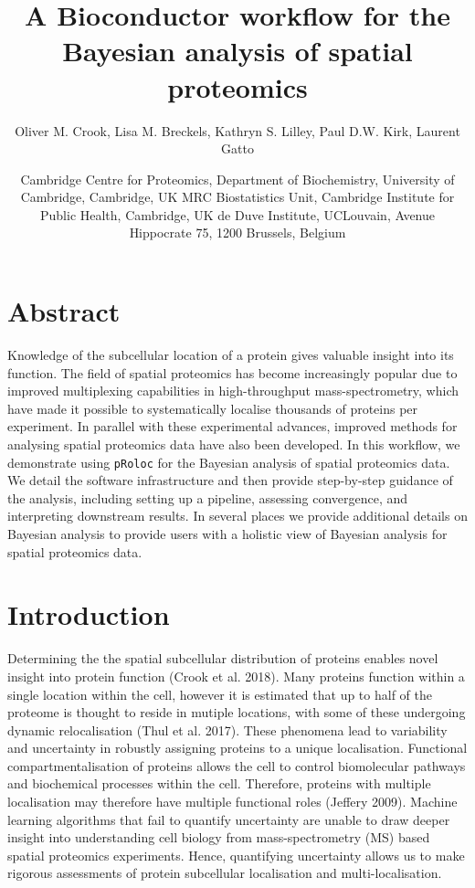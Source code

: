 \documentclass[]{article}
\title{A Bioconductor workflow for the Bayesian analysis of spatial proteomics}
\author{Oliver M. Crook, Lisa M. Breckels, Kathryn S. Lilley, Paul D.W. Kirk,
Laurent Gatto}
\date{Cambridge Centre for Proteomics, Department of Biochemistry, University
of Cambridge, Cambridge, UK \nsplit MRC Biostatistics Unit, Cambridge
Institute for Public Health, Cambridge, UK \nsplit de Duve Institute,
UCLouvain, Avenue Hippocrate 75, 1200 Brussels, Belgium}
\begin{document}
\maketitle

\newcommand{\diag}{\mathop{\mathrm{diag}}}

\section*{Abstract}\label{abstract}

Knowledge of the subcellular location of a protein gives valuable
insight into its function. The field of spatial proteomics has become
increasingly popular due to improved multiplexing capabilities in
high-throughput mass-spectrometry, which have made it possible to
systematically localise thousands of proteins per experiment. In
parallel with these experimental advances, improved methods for
analysing spatial proteomics data have also been developed. In this
workflow, we demonstrate using \texttt{pRoloc} for the Bayesian analysis
of spatial proteomics data. We detail the software infrastructure and
then provide step-by-step guidance of the analysis, including setting up
a pipeline, assessing convergence, and interpreting downstream results.
In several places we provide additional details on Bayesian analysis to
provide users with a holistic view of Bayesian analysis for spatial
proteomics data.

\section{Introduction}\label{introduction}

Determining the the spatial subcellular distribution of proteins enables
novel insight into protein function (Crook et al. 2018). Many proteins
function within a single location within the cell, however it is
estimated that up to half of the proteome is thought to reside in
mutiple locations, with some of these undergoing dynamic relocalisation
(Thul et al. 2017). These phenomena lead to variability and uncertainty
in robustly assigning proteins to a unique localisation. Functional
compartmentalisation of proteins allows the cell to control biomolecular
pathways and biochemical processes within the cell. Therefore, proteins
with multiple localisation may therefore have multiple functional roles
(Jeffery 2009). Machine learning algorithms that fail to quantify
uncertainty are unable to draw deeper insight into understanding cell
biology from mass-spectrometry (MS) based spatial proteomics
experiments. Hence, quantifying uncertainty allows us to make rigorous
assessments of protein subcellular localisation and multi-localisation.
\end{document}
